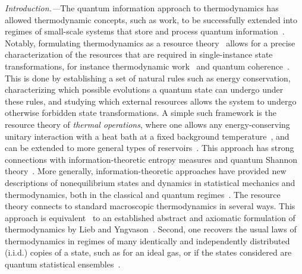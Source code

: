 \documentclass[prl,reprint,longbibliography,superscriptaddress]{revtex4-1}
\renewcommand\paragraph[1]{\par\emph{#1.---}\kern2pt\relax\ignorespaces}
\begin{document}
\paragraph{Introduction}The quantum information approach to thermodynamics has allowed thermodynamic
concepts, such as work, to be successfully extended into regimes of small-scale
systems that store and process quantum information~\cite{Goold2016JPA_review}.
Notably, formulating thermodynamics as a resource
theory~\cite{Janzing2000_cost,Horodecki2003PRA_NoisyOps,Brandao2013_resource,Chitambar2019RMP_resource} allows for a precise characterization of the
resources that are required in single-instance state transformations, for
instance thermodynamic work~\cite{Dahlsten2011NJP_inadequacy,Aberg2013_worklike,Horodecki2013_ThermoMaj} and quantum
coherence~\cite{Lostaglio2015NC_beyond,Korzekwa2016NJP_extraction,Gour2018NatComm_entropic,Marvian2018arXiv_distillation}.  This is done by
establishing a set of natural rules such as energy conservation, characterizing
which possible evolutions a quantum state can undergo under these rules, and
studying which external resources allows the system to undergo otherwise
forbidden state transformations.
A simple such framework is the resource theory of \emph{thermal operations},
where one allows any energy-conserving unitary interaction with a heat bath at a
fixed background temperature~\cite{Brandao2013_resource,Horodecki2013_ThermoMaj,Brandao2015PNAS_secondlaws}, and can be extended to
more general types of reservoirs~\cite{YungerHalpern2016PRE_beyond,Guryanova2016NatComm_multiple,YungerHalpern2016NatComm_NATSandNATO,HindsMingo2018_multiple}.  This approach has strong connections with
information-theoretic entropy measures and quantum Shannon
theory~\cite{Faist2015NatComm,Chubb2018Qu_beyond}.  More generally,
information-theoretic approaches have provided new descriptions of
nonequilibrium states and dynamics in statistical mechanics and thermodynamics,
both in the classical and quantum regimes~\cite{Esposito2009RMP_nonequilibrium,Sagawa2012LQC_secondlawlike,Seifert2012RPP_stochastic,Parrondo2015NPhys_thermodynamics,Tajima2016arXiv_large}.
The resource theory connects to standard macroscopic thermodynamics in several
ways.  This approach is equivalent~\cite{Weilenmann2016PRL_axiomatic,PhDMirjam2017,Weilenmann2018_smooth} to an established abstract and
axiomatic formulation of thermodynamics by Lieb and
Yngvason~\cite{Lieb1999_secondlaw,Lieb2004_guide_secondlaw,Lieb2013_entropy_noneq,Lieb2014PRSA_meter}.  Second, one recovers the usual
laws of thermodynamics in regimes of many identically and independently
distributed (i.i.d.\@) copies of a state, such as for an ideal gas, or if the
states considered are quantum statistical
ensembles~\cite{Brandao2013_resource,Horodecki2013_ThermoMaj,Matsumoto2010arXiv_reverse,Jiao2018JMP_convertibility,Faist2018PRX_workcost}.
\end{document}
